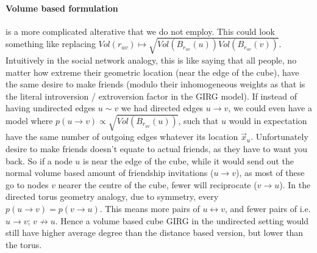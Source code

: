 \paragraph{Volume based formulation} is a more complicated alterative that we do not employ. This could look something like replacing $Vol(r_{uv}) \mapsto \sqrt{Vol(B_{r_{uv}}(u)) Vol(B_{r_{uv}}(v))}$.
Intuitively in the social network analogy, this is like saying that all people, no matter how extreme their geometric location (near the edge of the cube), have the same desire to make friends (modulo their inhomogeneous weights as that is the literal introversion / extroversion factor in the GIRG model). 
If instead of having undirected edges $u \sim v$ we had directed edges $u \to v$, we could even have a model where $p(u \to v) \propto \sqrt{Vol(B_{r_{uv}}(u))}$, such that $u$ would in expectation have the same number of outgoing edges whatever its location $\vec{x}_u$.
Unfortunately desire to make friends doesn't equate to actual friends, as they have to want you back.
So if a node $u$ is near the edge of the cube, while it would send out the normal volume based amount of friendship invitations ($u \to v$), as most of these go to nodes $v$ nearer the centre of the cube, fewer will reciprocate ($v \to u$). In the directed torus geometry analogy, due to symmetry, every $p(u \to v) = p(v \to u)$. This means more pairs of $u \leftrightarrow v$, and fewer pairs of  i.e. $u \to v;\, v \not\to u$.
Hence a volume based cube GIRG in the undirected setting would still have higher average degree than the distance based version, but lower than the torus.


